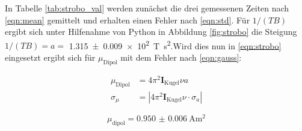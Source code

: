 In Tabelle \ref{tab:strobo_val} werden zunächst die drei gemessenen Zeiten nach \eqref{eqn:mean} gemittelt und erhalten einen
Fehler nach \eqref{eqn:std}.
Für $1/(TB)$ ergibt sich unter Hilfenahme von Python in Abbildung \ref{fig:strobo}
die Steigung $1/(TB)=a=$ \SI{1.315(9)e2}{\tesla\square\second}.Wird dies nun in \eqref{eqn:strobo} eingesetzt ergibt sich für $\mu_\text{Dipol}$
mit dem Fehler nach \eqref{eqn:gauss}:

\begin{align}
    \mu_\text{Dipol}&=4\pi^2\symbf{I}_\text{Kugel}\nu a\\
    \sigma_\mu &= \left|4\pi^2\symbf{I}_\text{Kugel}\nu\cdot\sigma_a\right|
\end{align}

\begin{equation*}
  \mu_\text{dipol}=\SI{0.950(6)}{\ampere\square\meter}
\end{equation*}
